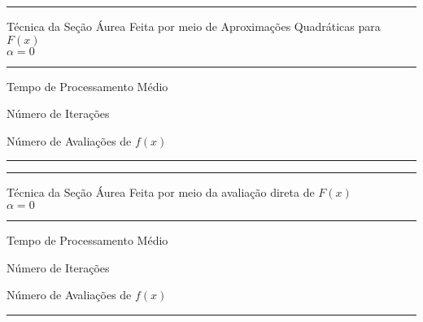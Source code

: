         \begin{minipage}[h!]{\linewidth}
            \centering
            \hrule
            \vspace{2mm}
            Técnica da Seção Áurea Feita por meio de Aproximações Quadráticas para $F(x)$ \\ $\alpha=0$
            \vspace{2mm}
            \noindent
            \hrule 
            \vspace{2mm}
            Tempo de Processamento Médio\\
            \label{tab:tblBa} 
            \writetablestt{\tblBa}\par
            \bigskip
            \centering
            Número de Iterações\\
            \label{tab:tblBb} 
            \writetablestt{\tblBb}\par
            \bigskip
            \centering
            Número de Avaliações de $f(x)$\\
            \label{tab:tblBc} 
            \writetablestt{\tblBc}\par
            \vspace{2mm}
            \hrule
            \vspace{2mm}
        \end{minipage}

        \begin{minipage}[h!]{\linewidth}
            \centering
            \hrule
            \vspace{2mm}
            Técnica da Seção Áurea Feita por meio da avaliação direta de $F(x)$ \\ $\alpha=0$
            \vspace{2mm}
            \noindent
            \hrule 
            \vspace{2mm}
            Tempo de Processamento Médio\\
            \label{tab:tblCa} 
            \writetablestt{\tblCa}\par
            \bigskip
            \centering
            Número de Iterações\\
            \label{tab:tblCb} 
            \writetablestt{\tblCb}\par
            \bigskip
            \centering
            Número de Avaliações de $f(x)$\\
            \label{tab:tblCc} 
            \writetablestt{\tblCc}\par
            \vspace{2mm}
            \hrule
            \vspace{2mm}
        \end{minipage}

